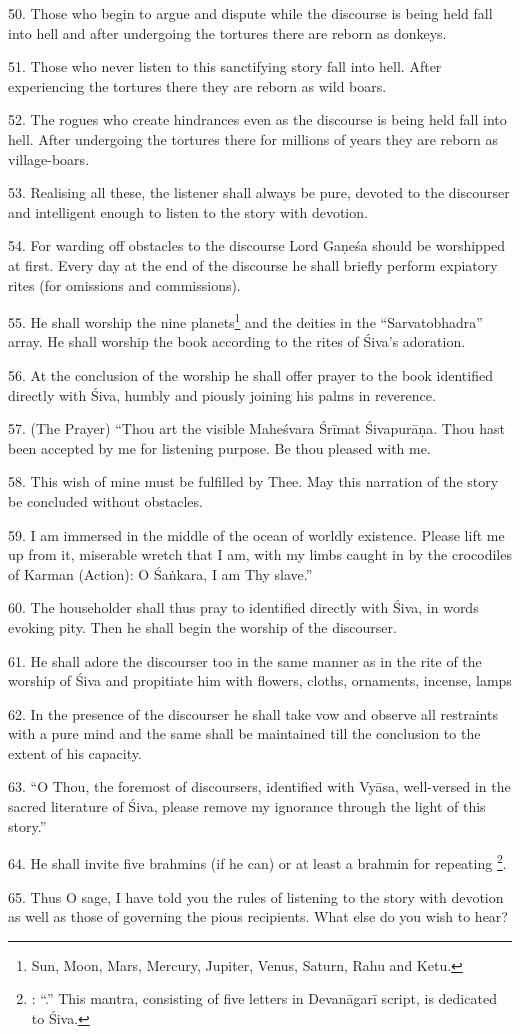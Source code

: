 50. Those who begin to argue and dispute while the discourse is being held fall
into hell and after undergoing the tortures there are reborn as donkeys.

51. Those who never listen to this sanctifying story fall into hell. After
experiencing the tortures there they are reborn as wild boars.

52. The rogues who create hindrances even as the discourse is being held fall
into hell. After undergoing the tortures there for millions of years they are
reborn as village-boars.

53. Realising all these, the listener shall always be pure, devoted to the
discourser and intelligent enough to listen to the story with devotion.

54. For warding off obstacles to the discourse Lord Gaṇeśa should be worshipped
at first. Every day at the end of the discourse he shall briefly perform
expiatory rites (for omissions and commissions).

55. He shall worship the nine planets\footnote{Sun, Moon, Mars, Mercury, Jupiter,
Venus, Saturn, Rahu and Ketu.} and the deities in the “Sarvatobhadra” array. He
shall worship the book according to the rites of Śiva’s adoration.

56. At the conclusion of the worship he shall offer prayer to the book
identified directly with Śiva, humbly and piously joining his palms in reverence.

57. (The Prayer) “Thou art the visible Maheśvara Śrīmat Śivapurāṇa. Thou hast
been accepted by me for listening purpose. Be thou pleased with me.

58. This wish of mine must be fulfilled by Thee. May this narration of the story
be concluded without obstacles.

59. I am immersed in the middle of the ocean of worldly existence. Please lift
me up from it, miserable wretch that I am, with my limbs caught in by the
crocodiles of Karman (Action): O Śaṅkara, I am Thy slave.”

60. The householder shall thus pray to  identified directly with
Śiva, in words evoking pity. Then he shall begin the worship of the discourser.

61. He shall adore the discourser too in the same manner as in the rite of the
worship of Śiva and propitiate him with flowers, cloths, ornaments, incense,
lamps \etc

62. In the presence of the discourser he shall take vow and observe all
restraints with a pure mind and the same shall be maintained till the conclusion
to the extent of his capacity.

63. “O Thou, the foremost of discoursers, identified with Vyāsa, well-versed in
the sacred literature of Śiva, please remove my ignorance through the light of
this story.”

64. He shall invite five brahmins (if he can) or at least a brahmin for repeating
\footnote{: “.”
This mantra, consisting of five letters in Devanāgarī script, is dedicated to
Śiva.}.

65. Thus O sage, I have told you the rules of listening to the story with
devotion as well as those of governing the pious recipients. What else do you
wish to hear?
